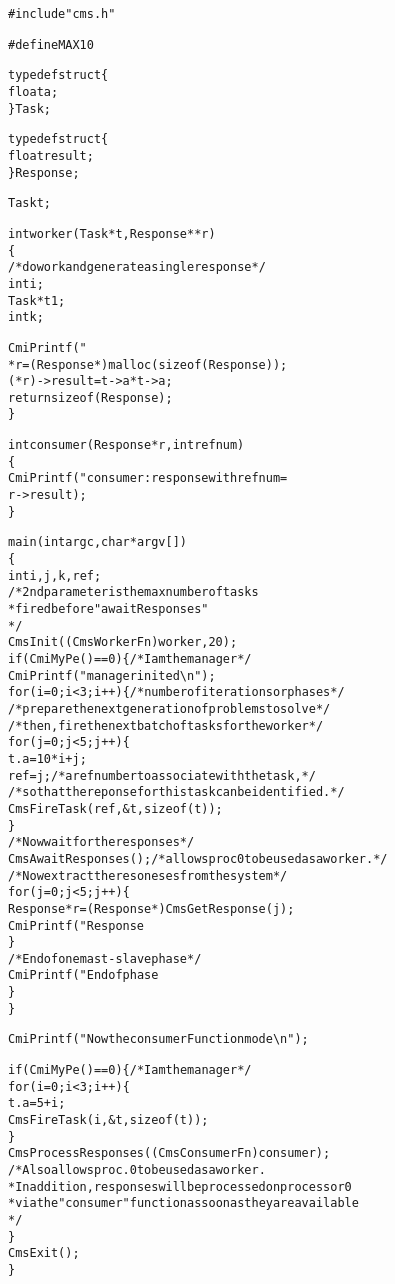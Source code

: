 \begin{alltt}
#include "cms.h"

#define MAX 10

typedef struct \{
    float a;
\} Task;

typedef struct \{
    float result;
\} Response;

Task t;

int worker(Task *t, Response **r)
\{
    /* do work and generate a single response */
    int i;
    Task *t1;
    int k;

    CmiPrintf("%d: in worker %f \verb+\n+", CmiMyPe(), t->a);
    *r = (Response *) malloc(sizeof(Response));
    (*r)->result = t->a * t->a;
    return sizeof(Response);
\}

int consumer(Response * r, int refnum)
\{
    CmiPrintf("consumer: response with refnum = %d is %f\verb+\n+", refnum,
              r->result);
\}

main(int argc, char *argv[])
\{
    int i, j, k, ref;
    /* 2nd parameter is the max number of tasks 
     * fired before "awaitResponses"
     */
    CmsInit((CmsWorkerFn)worker, 20);
    if (CmiMyPe() == 0) \{ /* I am the manager */
        CmiPrintf("manager inited\verb+\n+");
        for (i = 0; i < 3; i++) \{ /* number of iterations or phases */
          /* prepare the next generation of problems to solve */
          /* then, fire the next batch of tasks for the worker */
            for (j = 0; j < 5; j++) \{
                t.a = 10 * i + j;
                ref = j;  /* a ref number to associate with the task, */
                /* so that the reponse for this task can be identified. */
                CmsFireTask(ref, \&t, sizeof(t));
            \}
          /* Now wait for the responses */
            CmsAwaitResponses();  /* allows proc 0 to be used as a worker. */
            /* Now extract the resoneses from the system */
            for (j = 0; j < 5; j++) \{
                Response *r = (Response *) CmsGetResponse(j);
                CmiPrintf("Response %d is: %f \verb+\n+", j, r->result);
            \}
          /* End of one mast-slave phase */
            CmiPrintf("End of phase %d\verb+\n+", i);
        \}
    \}

    CmiPrintf("Now the consumerFunction mode\verb+\n+");

    if (CmiMyPe() == 0) \{ /* I am the manager */
       for (i = 0; i < 3; i++) \{
           t.a = 5 + i;
           CmsFireTask(i, \&t, sizeof(t));
       \}
       CmsProcessResponses((CmsConsumerFn)consumer);
       /* Also allows proc. 0 to be used as a worker. 
        * In addition, responses will be processed on processor 0 
        * via the "consumer" function as soon as they are available 
        */
    \}
    CmsExit();
\}
\end{alltt}
